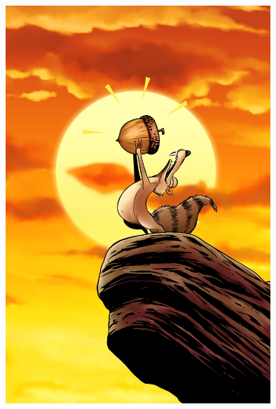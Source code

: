\documentclass[a4paper, 10pt, oneside]{memoir}
\begin{document}
\newpage
\thispagestyle{empty}
\begin{center}
\vspace*{5cm}
\includegraphics[width=10cm]{Images/reach.jpg}
\end{center}
\end{document}
